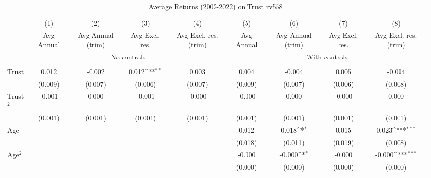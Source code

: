 \begin{table}[htbp]\centering
\def\sym#1{\ifmmode^{#1}\else\(^{#1}\)\fi}
\caption{Average Returns (2002-2022) on Trust rv558}
\begin{tabular}{l*{8}{c}}
\toprule
          &\multicolumn{1}{c}{(1)}&\multicolumn{1}{c}{(2)}&\multicolumn{1}{c}{(3)}&\multicolumn{1}{c}{(4)}&\multicolumn{1}{c}{(5)}&\multicolumn{1}{c}{(6)}&\multicolumn{1}{c}{(7)}&\multicolumn{1}{c}{(8)}\\
          &\multicolumn{1}{c}{Avg Annual}&\multicolumn{1}{c}{Avg Annual (trim)}&\multicolumn{1}{c}{Avg Excl. res.}&\multicolumn{1}{c}{Avg Excl. res. (trim)}&\multicolumn{1}{c}{Avg Annual}&\multicolumn{1}{c}{Avg Annual (trim)}&\multicolumn{1}{c}{Avg Excl. res.}&\multicolumn{1}{c}{Avg Excl. res. (trim)}\\
& \multicolumn{4}{c}{No controls} & \multicolumn{4}{c}{With controls} \\\\ \cmidrule(lr){2-5}\cmidrule(lr){6-9}
Trust     &    0.012         &   -0.002         &    0.012\sym{**} &    0.003         &    0.004         &   -0.004         &    0.005         &   -0.004         \\
          &  (0.009)         &  (0.007)         &  (0.006)         &  (0.007)         &  (0.009)         &  (0.007)         &  (0.006)         &  (0.008)         \\
Trust$^{2}$&   -0.001         &    0.000         &   -0.001         &   -0.000         &   -0.000         &    0.000         &   -0.000         &    0.000         \\
          &  (0.001)         &  (0.001)         &  (0.001)         &  (0.001)         &  (0.001)         &  (0.001)         &  (0.001)         &  (0.001)         \\
Age       &                  &                  &                  &                  &    0.012         &    0.018\sym{*}  &    0.015         &    0.023\sym{***}\\
          &                  &                  &                  &                  &  (0.018)         &  (0.011)         &  (0.019)         &  (0.008)         \\
Age$^{2}$ &                  &                  &                  &                  &   -0.000         &   -0.000\sym{*}  &   -0.000         &   -0.000\sym{***}\\
          &                  &                  &                  &                  &  (0.000)         &  (0.000)         &  (0.000)         &  (0.000)         \\

\end{tabular}
\end{table}

